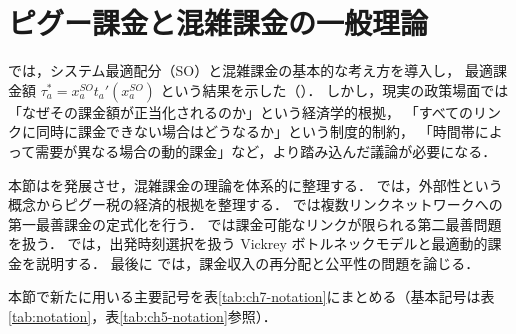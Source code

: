 
\section{ピグー課金と混雑課金の一般理論}
\label{sec:ch7-pigou}

では，システム最適配分（SO）と混雑課金の基本的な考え方を導入し，
最適課金額 $\tau_a^* = x_a^{SO} t_a'(x_a^{SO})$ という結果を示した（）．
しかし，現実の政策場面では「なぜその課金額が正当化されるのか」という経済学的根拠，
「すべてのリンクに同時に課金できない場合はどうなるか」という制度的制約，
「時間帯によって需要が異なる場合の動的課金」など，より踏み込んだ議論が必要になる．

本節はを発展させ，混雑課金の理論を体系的に整理する．
 では，外部性という概念からピグー税の経済的根拠を整理する．
 では複数リンクネットワークへの第一最善課金の定式化を行う．
 では課金可能なリンクが限られる第二最善問題を扱う．
 では，出発時刻選択を扱う
Vickrey ボトルネックモデルと最適動的課金を説明する．
最後に  では，課金収入の再分配と公平性の問題を論じる．

本節で新たに用いる主要記号を表\ref{tab:ch7-notation}にまとめる（基本記号は表\ref{tab:notation}，表\ref{tab:ch5-notation}参照）．

